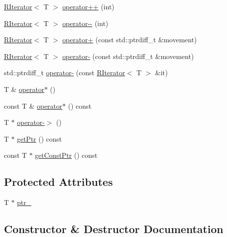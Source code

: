 \begin{DoxyCompactItemize}
\item 
\hyperlink{classCore_1_1RIterator}{R\+Iterator}$<$ T $>$ \hyperlink{classCore_1_1RIterator_acc3b7d33ea79eb00fcddf94fea22019e}{operator++} (int)
\item 
\hyperlink{classCore_1_1RIterator}{R\+Iterator}$<$ T $>$ \hyperlink{classCore_1_1RIterator_a8dea5798b779678b79242cb52404319f}{operator-\/-\/} (int)
\item 
\hyperlink{classCore_1_1RIterator}{R\+Iterator}$<$ T $>$ \hyperlink{classCore_1_1RIterator_a7f63a17ca928bf7d7cdf212d657c69e0}{operator+} (const std\+::ptrdiff\+\_\+t \&movement)
\item 
\hyperlink{classCore_1_1RIterator}{R\+Iterator}$<$ T $>$ \hyperlink{classCore_1_1RIterator_aacf7e1c216fd628c5fe5a3367229c2be}{operator-\/} (const std\+::ptrdiff\+\_\+t \&movement)
\item 
std\+::ptrdiff\+\_\+t \hyperlink{classCore_1_1RIterator_a9eaec053392188bec54490eda23e58e7}{operator-\/} (const \hyperlink{classCore_1_1RIterator}{R\+Iterator}$<$ T $>$ \&it)
\item 
T \& \hyperlink{classCore_1_1RIterator_aaf429e98758b728b5eb7fcbfc8e44df8}{operator$\ast$} ()
\item 
const T \& \hyperlink{classCore_1_1RIterator_a7a8fb86cae284e57391ece18c13636e8}{operator$\ast$} () const 
\item 
T $\ast$ \hyperlink{classCore_1_1RIterator_ac3e3610863a3ad804e464fe9c5bbf34a}{operator-\/$>$} ()
\item 
T $\ast$ \hyperlink{classCore_1_1RIterator_aafbbd9cf4a6adbe6ab1eb256b417a410}{get\+Ptr} () const 
\item 
const T $\ast$ \hyperlink{classCore_1_1RIterator_a5afd5fabdaf34e57a2c5d076b289e5ae}{get\+Const\+Ptr} () const 
\end{DoxyCompactItemize}
\subsection*{Protected Attributes}
\begin{DoxyCompactItemize}
\item 
T $\ast$ \hyperlink{classCore_1_1RIterator_a573cae85de41fabc83d39edb28074091}{ptr\+\_\+}
\end{DoxyCompactItemize}


\subsection{Constructor \& Destructor Documentation}
